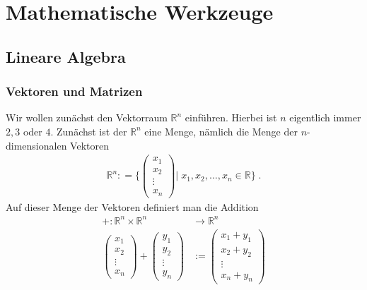 \section{Mathematische Werkzeuge}

\subsection{Lineare Algebra}
\subsubsection{Vektoren und Matrizen}
Wir wollen zunächst  den Vektorraum $\mathbb{R}^n$ einführen. Hierbei ist $n$ eigentlich immer $2,3$ oder $4$.
Zunächst ist der $\mathbb{R}^n$  eine Menge, nämlich die Menge der $n$-dimensionalen Vektoren 
\begin{align*}
\mathbb{R}^n : = \Biggl \{
\begin{pmatrix}
x_1 \\ x_2 \\ \vdots \\ x_n
\end{pmatrix} \Bigg | \; x_1, x_2, \hdots ,x_n \in \mathbb{R}
 \Biggr \}  \; .
\end{align*}
Auf dieser Menge der Vektoren definiert man die Addition
\begin{align*}
+ : \mathbb{R}^n \times  \mathbb{R}^n   & \to \mathbb{R}^n \\
\begin{pmatrix}
x_1 \\ x_2 \\ \vdots \\ x_n
\end{pmatrix}  +  
\begin{pmatrix}
y_1 \\ y_2 \\ \vdots \\ y_n
\end{pmatrix} 
&  :=  \begin{pmatrix}
x_1 + y_1 \\ x_2  + y_2 \\ \vdots \\ x_n + y_n
\end{pmatrix} 
\end{align*}

